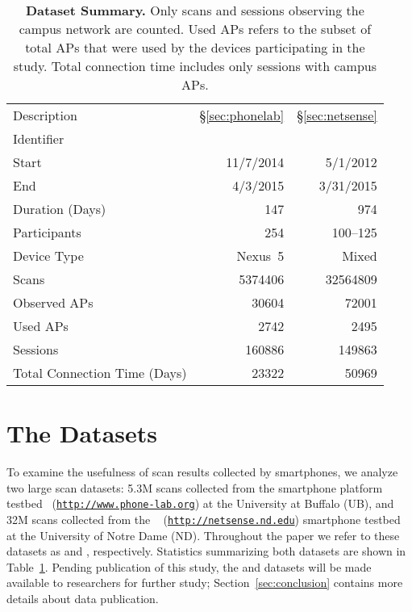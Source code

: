 \begin{table}[t]
  {\small
  \begin{tabularx}{\columnwidth}{Xrr}
    & \PhoneLab{} & \NetSense{}\\\midrule
    Description & \S\ref{sec:phonelab} & \S\ref{sec:netsense} \\
    Identifier & \ubscan{} & \ndscan{} \\ 
    Start & 11/7/2014 & 5/1/2012 \\ 
    End & 4/3/2015 & 3/31/2015 \\ 
    Duration (Days) & 147 & 974 \\ \midrule
    Participants & 254 & 100--125 \\
    Device Type & Nexus~5 & Mixed \\ \midrule
    Scans & \num{5374406} & \num{32564809} \\
    Observed APs & \num{30604} & \num{72001} \\
    Used APs & \num{2742} & \num{2495}\\ \midrule
    \wifi{} Sessions & \num{160886} & \num{149863} \\
    Total Connection Time (Days) & \num{23322} & \num{50969} 
  \end{tabularx}
  \caption{\textbf{Dataset Summary.} Only \wifi{} scans and sessions
  observing the campus network are counted. Used APs refers to the subset of
  total APs that were used by the devices participating in the study. Total
connection time includes only \wifi{} sessions with campus APs.}
  \label{tab:stats}
}
\end{table}

\section{The Datasets}
\label{sec:dataset}

To examine the usefulness of \wifi{} scan results collected by smartphones,
we analyze two large scan datasets: 5.3M scans collected from the \PhoneLab{}
smartphone platform testbed~\cite{phonelab-sensemine13}
(\href{http://www.phone-lab.org}{\texttt{http://www.phone-lab.org}}) at the
University at Buffalo (UB), and 32M scans collected from the
\NetSense{}~\cite{striegel2013lessons}
(\href{http://netsense.nd.edu}{\texttt{http://netsense.nd.edu}}) smartphone
testbed at the University of Notre Dame (ND). Throughout the paper we refer
to these datasets as \textbf{\ubscan{}} and \textbf{\ndscan{}}, respectively.
%
Statistics summarizing both datasets are shown in Table~\ref{tab:stats}.
%
Pending publication of this study, the \ubscan{} and \ndscan{} datasets will be
made available to researchers for further study; Section~\ref{sec:conclusion}
contains more details about data publication.

